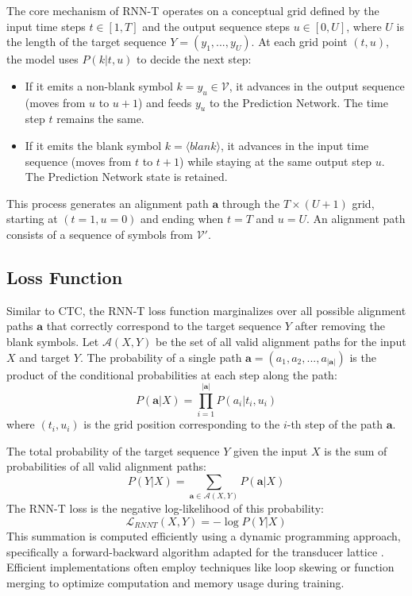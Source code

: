 The core mechanism of RNN-T operates on a conceptual grid defined by the input time steps $t \in [1, T]$ and the output sequence steps $u \in [0, U]$, where $U$ is the length of the target sequence $Y=(y_1, ..., y_U)$. At each grid point $(t, u)$, the model uses $P(k | t, u)$ to decide the next step:
\begin{itemize}
    \item If it emits a non-blank symbol $k = y_u \in \mathcal{V}$, it advances in the output sequence (moves from $u$ to $u+1$) and feeds $y_u$ to the Prediction Network. The time step $t$ remains the same.
    \item If it emits the blank symbol $k = \langle blank \rangle$, it advances in the input time sequence (moves from $t$ to $t+1$) while staying at the same output step $u$. The Prediction Network state is retained.
\end{itemize}
This process generates an alignment path $\mathbf{a}$ through the $T \times (U+1)$ grid, starting at $(t=1, u=0)$ and ending when $t=T$ and $u=U$. An alignment path consists of a sequence of symbols from $\mathcal{V}'$.

\subsection{Loss Function}

Similar to CTC, the RNN-T loss function marginalizes over all possible alignment paths $\mathbf{a}$ that correctly correspond to the target sequence $Y$ after removing the blank symbols. Let $\mathcal{A}(X, Y)$ be the set of all valid alignment paths for the input $X$ and target $Y$. The probability of a single path $\mathbf{a} = (a_1, a_2, ..., a_{|\mathbf{a}|})$ is the product of the conditional probabilities at each step along the path:
\begin{equation}
    P(\mathbf{a} | X) = \prod_{i=1}^{|\mathbf{a}|} P(a_i | t_i, u_i)
\end{equation}
where $(t_i, u_i)$ is the grid position corresponding to the $i$-th step of the path $\mathbf{a}$.

The total probability of the target sequence $Y$ given the input $X$ is the sum of probabilities of all valid alignment paths:
\begin{equation}
    P(Y | X) = \sum_{\mathbf{a} \in \mathcal{A}(X, Y)} P(\mathbf{a} | X)
\end{equation}
The RNN-T loss is the negative log-likelihood of this probability:
\begin{equation} \label{eq:rnnt_loss}
    \mathcal{L}_{RNNT}(X, Y) = -\log P(Y | X)
\end{equation}
This summation is computed efficiently using a dynamic programming approach, specifically a forward-backward algorithm adapted for the transducer lattice \cite{graves2012sequence}. Efficient implementations often employ techniques like loop skewing \cite{bagby2018} or function merging \cite{8661174} to optimize computation and memory usage during training.

